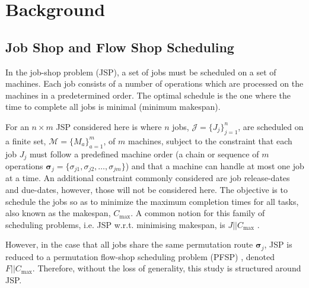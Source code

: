 \documentclass[smallextended]{svjour3}
\renewcommand{\vsigma}{\bm \sigma}
\begin{document}

\section{Background}


\subsection{Job Shop and Flow Shop Scheduling}
In the job-shop problem (JSP), a set of jobs must be scheduled on a set of machines. Each job consists of a number of operations which are processed on the machines in a predetermined order. The optimal schedule is the one where the time to complete all jobs is minimal (minimum makespan).

For an $n\times m$ JSP considered here is where $n$ jobs, $\mathcal{J}=\{J_j\}_{j=1}^n$, are scheduled on a finite set, $\mathcal{M}=\{M_a\}_{a=1}^m$, of $m$ machines, subject to the constraint that each job $J_j$ must follow a predefined machine order (a chain or sequence of $m$ operations $\vsigma_j=\{\sigma_{j1},\sigma_{j2},\dotsc,\sigma_{jm}\}$) and that a machine can handle at most one job at a time. 
An additional constraint commonly considered are job release-dates and due-dates, however, those will not be considered here. 
The objective is to schedule the jobs so as to minimize the maximum completion times for all tasks, also known as the makespan, $C_{\max}$. A common notion for this family of scheduling problems, i.e. JSP w.r.t. minimising makespan, is $J||C_{\max}$ \citep{Pinedo08}. 

However, in the case that all jobs share the same permutation route $\vsigma_j$, JSP is reduced to a permutation flow-shop scheduling problem (PFSP) \citep{Guinet1998,Tay08}, denoted $F||C_{\max}$. Therefore, without the loss of generality, this study is structured around JSP. 
\end{document}
